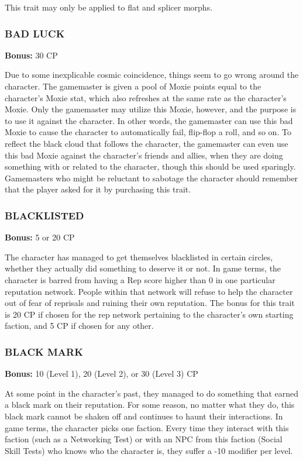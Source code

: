 This trait may only be applied to flat and splicer morphs.

\subsubsection{BAD LUCK}
\textbf{Bonus:} 30 CP

Due to some inexplicable cosmic coincidence, things seem to go wrong around the
character. The gamemaster is given a pool of Moxie points equal to the
character’s Moxie stat, which also refreshes at the same rate as the
character’s Moxie. Only the gamemaster may utilize this Moxie, however, and the
purpose is to use it against the character. In other words, the gamemaster can
use this bad Moxie to cause the character to automatically fail, flip-flop a
roll, and so on. To reflect the black cloud that follows the character, the
gamemaster can even use this bad Moxie against the character’s friends and
allies, when they are doing something with or related to the character, though
this should be used sparingly.  Gamemasters who might be reluctant to sabotage
the character should remember that the player asked for it by purchasing this
trait.

\subsubsection{BLACKLISTED}
\textbf{Bonus:} 5 or 20 CP

The character has managed to get themselves blacklisted in certain circles,
whether they actually did something to deserve it or not. In game terms, the
character is barred from having a Rep score higher than 0 in one particular
reputation network. People within that network will refuse to help the
character out of fear of reprisals and ruining their own reputation. The
bonus for this trait is 20 CP if chosen for the rep network pertaining to the
character’s own starting faction, and 5 CP if chosen for any other.

\subsubsection{BLACK MARK}
\textbf{Bonus:} 10 (Level 1), 20 (Level 2), or 30 (Level 3) CP

At some point in the character’s past, they managed to do something that earned
a black mark on their reputation. For some reason, no matter what they do, this
black mark cannot be shaken off and continues to haunt their interactions. In
game terms, the character picks one faction. Every time they interact with this
faction (such as a Networking Test) or with an NPC from this faction (Social
Skill Tests) who knows who the character is, they suffer a -10 modifier per
level.

